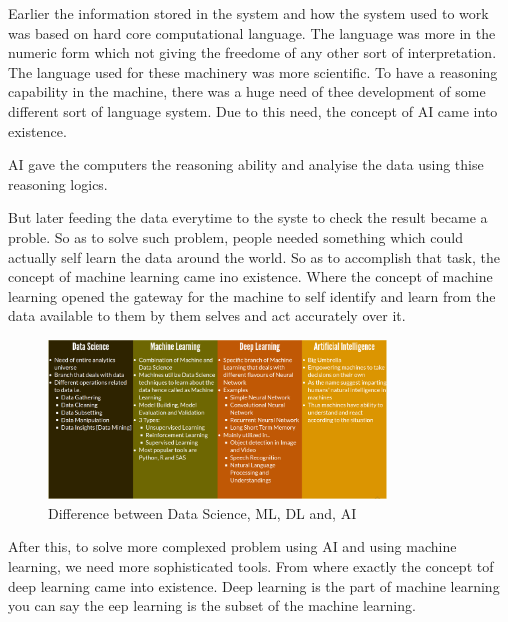 
Earlier the information stored in the system and how the system used to work was based on hard core computational language. The language was more in the numeric form which not giving the freedome of any other sort of interpretation. The language used for these machinery was more scientific. To have a reasoning capability in the machine, there was a huge need of thee development of some different sort of language system. Due to this need, the concept of AI came into existence.

AI gave the computers the reasoning ability and analyise the data using thise reasoning logics.

But later feeding the data everytime to the syste to check the result became a proble. So as to solve such problem, people needed something which could actually self learn the data around the world. So as to accomplish that task, the concept of machine learning came ino existence. Where the concept of machine learning opened the gateway for the machine to self identify and learn from the data available to  them by them selves and act accurately over it.

\begin{figure}[ht]
	\centering
	\includegraphics[width=0.8\textwidth]{images/ai.png}
	\caption{Difference between Data Science, ML, DL and, AI }
	\label{fig:ai}
\end{figure}


After this, to solve more complexed problem using AI and using machine learning,  we need more sophisticated tools. From where exactly the concept tof deep learning came into existence. Deep learning is the part of machine learning you can say the eep learning is the subset of the machine learning.


